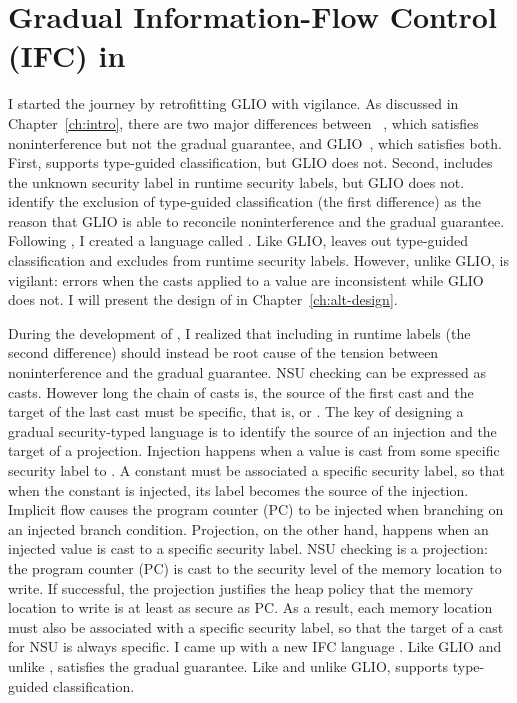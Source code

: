 \chapter{Gradual Information-Flow Control (IFC) in \Surface}
\label{ch:examples}

I started the journey by retrofitting GLIO with vigilance. As discussed in
Chapter~\ref{ch:intro}, there are two major differences between
\GSLRef~\parencite{Toro:2018aa}, which satisfies noninterference but not the
gradual guarantee, and GLIO~\parencite{Amorim:2020aa}, which satisfies both.
First, \GSLRef supports type-guided classification, but GLIO does not. Second,
\GSLRef includes the unknown security label \unk in runtime security labels, but
GLIO does not. \textcite{Amorim:2020aa} identify the exclusion of type-guided
classification (the first difference) as the reason that GLIO is able to
reconcile noninterference and the gradual guarantee. Following
\textcite{Amorim:2020aa}, I created a language called \SurfaceOld. Like GLIO,
\SurfaceOld leaves out type-guided classification and excludes \unk from runtime
security labels. However, unlike GLIO, \SurfaceOld is vigilant: \SurfaceOld
errors when the casts applied to a value are inconsistent while GLIO does not. I
will present the design of \SurfaceOld in Chapter~\ref{ch:alt-design}.

During the development of \SurfaceOld, I realized that including \unk in runtime
labels (the second difference) should instead be root cause of the tension
between noninterference and the gradual guarantee. NSU checking can be expressed
as casts. However long the chain of casts is, the source of the first cast and
the target of the last cast must be specific, that is, \low or \high. The key of
designing a gradual security-typed language is to identify the source of an
injection and the target of a projection. Injection happens when a value is cast
from some specific security label to \unk. A constant must be associated a
specific security label, so that when the constant is injected, its label
becomes the source of the injection. Implicit flow causes the program counter
(PC) to be injected when branching on an injected branch condition. Projection,
on the other hand, happens when an injected value is cast to a specific security
label. NSU checking is a projection: the program counter (PC) is cast to the
security level of the memory location to write. If successful, the projection
justifies the heap policy that the memory location to write is at least as
secure as PC. As a result, each memory location must also be associated with a
specific security label, so that the target of a cast for NSU is always
specific. I came up with a new IFC language \Surface. Like GLIO and unlike
\GSLRef, \Surface satisfies the gradual guarantee. Like \GSLRef and unlike GLIO,
\Surface supports type-guided classification.

